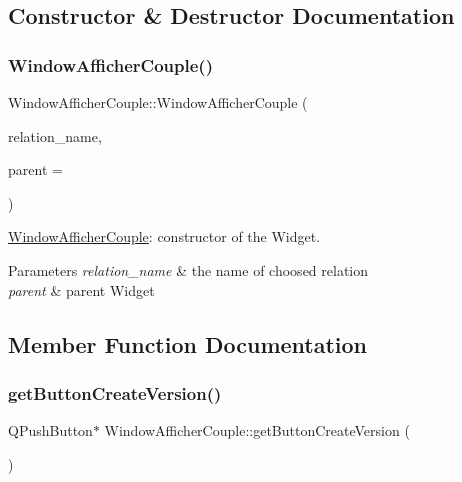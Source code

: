 \subsection{Constructor \& Destructor Documentation}
\mbox{\label{class_window_afficher_couple_a6f57f30e30be963212ea7a355f460c30}} 
\subsubsection{\texorpdfstring{Window\+Afficher\+Couple()}{WindowAfficherCouple()}}
{\footnotesize\ttfamily Window\+Afficher\+Couple\+::\+Window\+Afficher\+Couple (\begin{DoxyParamCaption}\item[{Q\+String \&}]{relation\+\_\+name,  }\item[{Q\+Widget $\ast$}]{parent = {} }\end{DoxyParamCaption})}



\hyperlink{class_window_afficher_couple}{Window\+Afficher\+Couple}\+: constructor of the Widget. 


\begin{DoxyParams}{Parameters}
{\em relation\+\_\+name} & the name of choosed relation \\
\hline
{\em parent} & parent Widget \\
\hline
\end{DoxyParams}


\subsection{Member Function Documentation}
\mbox{\label{class_window_afficher_couple_af6825c2bdd3c0612409d517f229a5e60}} 
\subsubsection{\texorpdfstring{get\+Button\+Create\+Version()}{getButtonCreateVersion()}}
{\footnotesize\ttfamily Q\+Push\+Button$\ast$ Window\+Afficher\+Couple\+::get\+Button\+Create\+Version (\begin{DoxyParamCaption}{ }\end{DoxyParamCaption})\hspace{0.3cm}{\ttfamily [inline]}}



